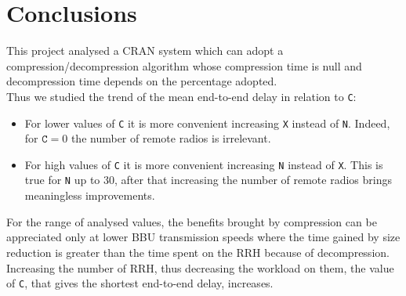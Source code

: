 \documentclass[11pt,a4paper,oneside, openright]{article}
\begin{document}
\section{Conclusions}
This project analysed a CRAN system which can adopt a compression/decompression algorithm whose compression time is null and decompression time depends on the percentage adopted.\\
Thus we studied the trend of the mean end-to-end delay in relation to \texttt{C}: 
\begin{itemize}
	\item For lower values of \texttt{C} it is more convenient increasing \texttt{X} instead of \texttt{N}. Indeed, for $\texttt{C} = 0 $ the number of remote radios is irrelevant.
	\item For high values of \texttt{C} it is more convenient increasing \texttt{N} instead of \texttt{X}. This is true for \texttt{N} up to 30, after that increasing the number of remote radios brings meaningless improvements.
\end{itemize}
For the range of analysed values, the benefits brought by compression can be appreciated only at lower BBU transmission speeds where the time gained by size reduction is greater than the time spent on the RRH because of decompression. Increasing the number of RRH, thus decreasing the workload on them, the value of \texttt{C}, that gives the shortest end-to-end delay, increases.
\end{document}
